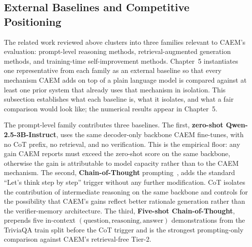 \subsection{External Baselines and Competitive Positioning}
\label{sec:external-baselines}

The related work reviewed above clusters into three families relevant to CAEM's evaluation: prompt-level reasoning methods, retrieval-augmented generation methods, and training-time self-improvement methods. Chapter~5 instantiates one representative from each family as an external baseline so that every mechanism CAEM adds on top of a plain language model is compared against at least one prior system that already uses that mechanism in isolation. This subsection establishes what each baseline is, what it isolates, and what a fair comparison would look like; the numerical results appear in Chapter~5.

The prompt-level family contributes three baselines. The first, \textbf{zero-shot Qwen-2.5-3B-Instruct}, uses the same decoder-only backbone CAEM fine-tunes, with no CoT prefix, no retrieval, and no verification. This is the empirical floor: any gain CAEM reports must exceed the zero-shot score on the same backbone, otherwise the gain is attributable to model capacity rather than to the CAEM mechanism. The second, \textbf{Chain-of-Thought} prompting~\cite{wei2022chain}, adds the standard ``Let's think step by step'' trigger without any further modification. CoT isolates the contribution of intermediate reasoning on the same backbone and controls for the possibility that CAEM's gains reflect better rationale generation rather than the verifier-memory architecture. The third, \textbf{Five-shot Chain-of-Thought}, prepends five in-context $(\text{question}, \text{reasoning}, \text{answer})$ demonstrations from the TriviaQA train split before the CoT trigger and is the strongest prompting-only comparison against CAEM's retrieval-free Tier-2.

